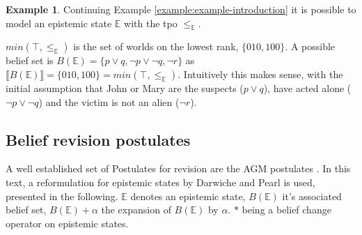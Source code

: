 \documentclass[english, 12pt]{scrartcl}
\theoremstyle{definition}
\newtheorem{example}{Example}
\theoremstyle{definition}
\theoremstyle{definition}
\newcommand{\modelsOf}[1]{\llbracket #1 \rrbracket}
\begin{document}
\begin{example}
    Continuing Example \ref{example:example-introduction} it is possible to model an epistemic state $\mathbb{E}$ with the tpo $\leq_{\mathbb{E}}$.
    
    $min(\top, \leq_{\mathbb{E}})$ is the set of worlds on the lowest rank, $\{010, 100\}$. A possible belief set is $B(\mathbb{E}) = \{p \vee q, \neg p \vee \neg q, \neg r\}$ as $\modelsOf{B(\mathbb{E})} = \{010, 100\} = min(\top, \leq_{\mathbb{E}})$. Intuitively this makes sense, with the initial assumption that John or Mary are the suspects ($p \vee q$), have acted alone ($\neg p \vee \neg q$) and the victim is not an alien ($\neg r$).
\end{example}




\subsection{Belief revision postulates}
\label{chapter:dp-agm-postulates}
A well established set of Postulates for revision are the AGM postulates \cite{Alchourron1985}. In this text, a reformulation for epistemic states by Darwiche and Pearl \cite{Darwiche1997} is used, presented in the following. $\mathbb{E}$ denotes an epistemic state, $B(\mathbb{E})$ it's associated belief set, $B(\mathbb{E}) + \alpha$ the expansion of $B(\mathbb{E})$ by $\alpha$. $\ast$ being a belief change operator on epistemic states. 
\end{document}
